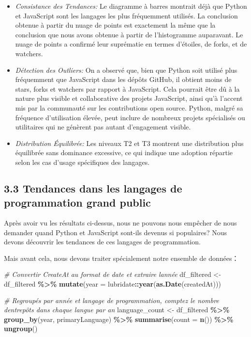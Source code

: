 \documentclass[
]{article}
\newenvironment{Shaded}{\begin{snugshade}}{\end{snugshade}}
\newcommand{\AttributeTok}[1]{\textcolor[rgb]{0.13,0.29,0.53}{#1}}
\newcommand{\CommentTok}[1]{\textcolor[rgb]{0.56,0.35,0.01}{\textit{#1}}}
\newcommand{\FunctionTok}[1]{\textcolor[rgb]{0.13,0.29,0.53}{\textbf{#1}}}
\newcommand{\NormalTok}[1]{#1}
\newcommand{\OtherTok}[1]{\textcolor[rgb]{0.56,0.35,0.01}{#1}}
\newcommand{\SpecialCharTok}[1]{\textcolor[rgb]{0.81,0.36,0.00}{\textbf{#1}}}
\providecommand{\tightlist}{%
  \setlength{\itemsep}{0pt}\setlength{\parskip}{0pt}}
\begin{document}
\begin{itemize}
\tightlist
\item
  \emph{Consistance des Tendances:} Le diagramme à barres montrait déjà
  que Python et JavaScript sont les langages les plus fréquemment
  utilisés. La conclusion obtenue à partir du nuage de points est
  exactement la même que la conclusion que nous avons obtenue à partir
  de l'histogramme auparavant. Le nuage de points a confirmé leur
  suprématie en termes d'étoiles, de forks, et de watchers.
\item
  \emph{Détection des Outliers:} On a observé que, bien que Python soit
  utilisé plus fréquemment que JavaScript dans les dépôts GitHub, il
  obtient moins de stars, forks et watchers par rapport à JavaScript.
  Cela pourrait être dû à la nature plus visible et collaborative des
  projets JavaScript, ainsi qu'à l'accent mis par la communauté sur les
  contributions open source. Python, malgré sa fréquence d'utilisation
  élevée, peut inclure de nombreux projets spécialisés ou utilitaires
  qui ne génèrent pas autant d'engagement visible.
\item
  \emph{Distribution Équilibrée:} Les niveaux T2 et T3 montrent une
  distribution plus équilibrée sans dominance excessive, ce qui indique
  une adoption répartie selon les cas d'usage spécifiques des langages.
\end{itemize}

\subsection{3.3 Tendances dans les langages de programmation grand
public}\label{tendances-dans-les-langages-de-programmation-grand-public}

Après avoir vu les résultats ci-dessus, nous ne pouvons nous empêcher de
nous demander quand Python et JavaScript sont-ils devenus si populaires?
Nous devons découvrir les tendances de ces langages de programmation.

Mais avant cela, nous devons traiter spécialement notre ensemble de
données：

\begin{Shaded}
\begin{Highlighting}[]
\CommentTok{\# Convertir CreateAt au format de date et extraire l\textquotesingle{}année}
\NormalTok{df\_filtered }\OtherTok{\textless{}{-}}\NormalTok{ df\_filtered }\SpecialCharTok{\%\textgreater{}\%}
  \FunctionTok{mutate}\NormalTok{(}\AttributeTok{year =}\NormalTok{ lubridate}\SpecialCharTok{::}\FunctionTok{year}\NormalTok{(}\FunctionTok{as.Date}\NormalTok{(createdAt)))}

\CommentTok{\# Regroupés par année et langage de programmation, comptez le nombre d\textquotesingle{}entrepôts dans chaque langue par an}
\NormalTok{language\_count }\OtherTok{\textless{}{-}}\NormalTok{ df\_filtered }\SpecialCharTok{\%\textgreater{}\%}
  \FunctionTok{group\_by}\NormalTok{(year, primaryLanguage) }\SpecialCharTok{\%\textgreater{}\%}
  \FunctionTok{summarise}\NormalTok{(}\AttributeTok{count =} \FunctionTok{n}\NormalTok{()) }\SpecialCharTok{\%\textgreater{}\%}
  \FunctionTok{ungroup}\NormalTok{()}
\end{Highlighting}
\end{Shaded}
\end{document}
